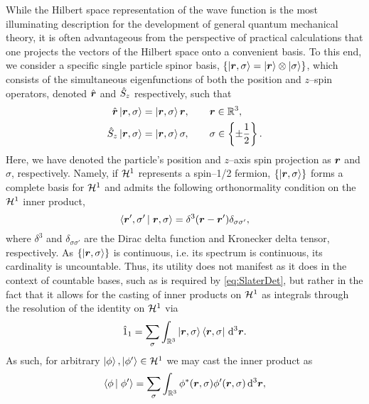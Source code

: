While the Hilbert space representation of the wave function is the most illuminating description for the development of
general quantum mechanical theory, it is often advantageous from the perspective of practical calculations that one
projects the vectors of the Hilbert space onto a convenient basis. 
To this end, we consider a specific single particle spinor basis, $\left \lbrace \left\vert \boldsymbol{r},\sigma \right\rangle = \left\vert \boldsymbol{r} \right\rangle\otimes\left\vert \sigma \right\rangle \right\rbrace$, 
which consists of the simultaneous eigenfunctions
of both the position and $z$--spin operators, denoted $\hat{\boldsymbol{r}}$ and $\hat{S}_z$ respectively,
such that
\begin{subequations}
\begin{align}
  \hat{\boldsymbol{r}}\left\vert \boldsymbol{r},\sigma \right\rangle &= \left\vert \boldsymbol{r},\sigma \right\rangle\boldsymbol{r}, \qquad \boldsymbol{r}\in\mathbb{R}^3, \\
  \hat{S}_z\left\vert \boldsymbol{r},\sigma \right\rangle    &= \left\vert \boldsymbol{r},\sigma \right\rangle\sigma, \qquad \sigma \in \left \lbrace \pm\frac{1}{2} \right\rbrace.
\end{align}
\end{subequations}
Here, we have denoted the particle's position and $z$--axis spin projection as $\boldsymbol{r}$ and $\sigma$, respectively.
Namely, if $\mathcal{H}^1$ represents a spin--1/2 fermion, $\left \lbrace \left\vert \boldsymbol{r},\sigma \right\rangle \right\rbrace$ forms a complete basis for $\mathcal{H}^1$ 
and admits the following orthonormality  condition on the $\mathcal{H}^1$ inner product,
\begin{equation}
  \label{eq:SpinorInner}
  \left\langle \boldsymbol{r}',\sigma' \left\vert\right. \boldsymbol{r},\sigma \right\rangle = \delta^3(\boldsymbol{r} - \boldsymbol{r}')\delta_{\sigma\sigma'},
\end{equation}
where $\delta^3$ and $\delta_{\sigma\sigma'}$ are the Dirac delta function and Kronecker delta tensor, respectively.
As $\left \lbrace \left\vert \boldsymbol{r},\sigma \right\rangle \right\rbrace$ is continuous, i.e. its spectrum is continuous, its cardinality is uncountable. Thus,
its utility does not manifest as it does in the context of countable bases, such as is required by \cref{eq:SlaterDet},
but rather in the fact that it allows for the casting of inner products on $\mathcal{H}^1$ as integrals through the resolution
of the identity on $\mathcal{H}^1$ via
\begin{equation}
  \label{eq:H1Identity}
  \hat{1}_1 = \sum_\sigma \int_{\mathbb R ^3} \left\vert \boldsymbol{r},\sigma \right\rangle\left\langle \boldsymbol{r},\sigma \right\vert \,\mathrm{d}^3\boldsymbol{r}.
\end{equation}
As such, for arbitrary $\left\vert \phi \right\rangle,\left\vert \phi' \right\rangle\in\mathcal{H}^1$ we may cast the inner product as
\begin{equation}
\left\langle \phi \left\vert\right. \phi' \right\rangle = \sum_\sigma \int_{\mathbb R ^3} \phi^*(\boldsymbol{r},\sigma) \phi'(\boldsymbol{r},\sigma) \,\mathrm{d}^3\boldsymbol{r},
\end{equation}
